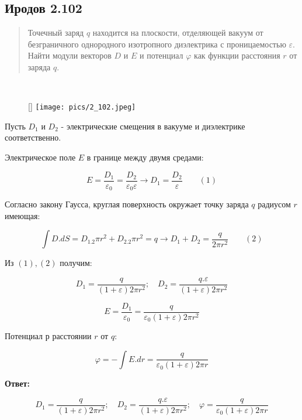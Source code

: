 \subsection*{Иродов 2.102}

\setcounter{equation}{0}

\begin{abstract}
Точечный заряд $q$ находится на плоскости, отделяющей вакуум от безграничного однородного изотропного диэлектрика с проницаемостью $\varepsilon$. Найти модули векторов $D$ и $E$ и потенциал $\varphi$ как функции расстояния $r$ от заряда $q$.
\end{abstract}

\noindent \hrulefill
\\
\begin{wrapfigure}[6]{r}{0.30\textwidth}
	\raisebox{0pt}[\dimexpr{}\baselineskip\relax]{
	\texttt{[image: pics/2\_102.jpeg]}}
\end{wrapfigure}

Пусть $D_1$ и $D_2$ - электрические смещения в вакууме и диэлектрике соответственно.

Электрическое поле $E$ в границе между двумя средами:

$$E = \frac{D_1}{\varepsilon_0} = \frac{D_2}{\varepsilon_0 \varepsilon} \xrightarrow{} D_1 = \frac{D_2}{\varepsilon}    \qquad (1)$$

Согласно закону Гаусса, круглая поверхность окружает точку заряда $q$ радиусом $r$ имеющая:

$$\displaystyle \int D.dS = D_1.2\pi r^2 + D_2.2 \pi r^2 = q \xrightarrow[]{} D_1 + D_2 = \frac{q}{2\pi r^2}    \qquad (2)$$

Из $(1), (2) $ получим:

$$D_1 = \frac{q}{(1+\varepsilon)2\pi r^2} ; \quad D_2 = \frac{q .\varepsilon}{(1+\varepsilon)2\pi r^2} $$

$$E = \frac{D_1}{\varepsilon_0} = \frac{q}{\varepsilon_0(1+\varepsilon)2\pi r^2}$$

Потенциал р расстоянии $r$ от $q$:

$$\varphi = - \displaystyle \int E.dr = \frac{q}{\varepsilon_0(1+\varepsilon)2 \pi r}$$

\textbf{Ответ:}

$$D_1 = \frac{q}{(1+\varepsilon)2\pi r^2} ; \quad D_2 = \frac{q .\varepsilon}{(1+\varepsilon)2\pi r^2} ; \quad \varphi = \frac{q}{\varepsilon_0(1+\varepsilon)2 \pi r}$$





